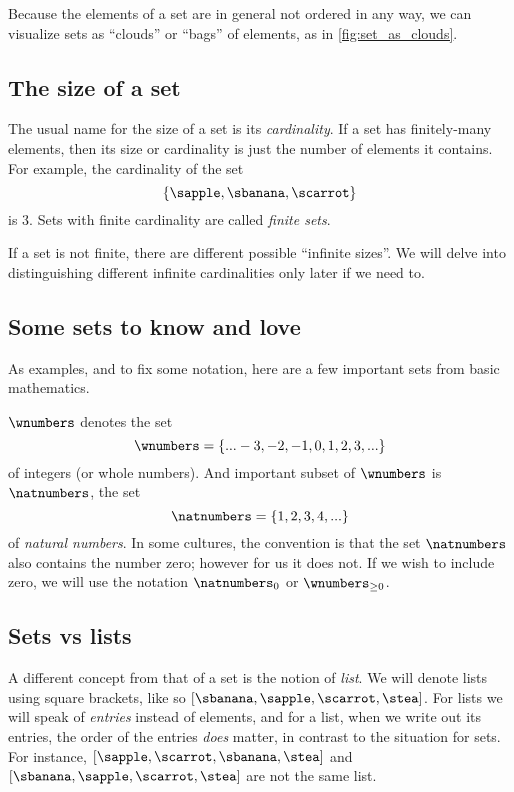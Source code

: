 Because the elements of a set are in general not ordered in any way, we can visualize sets as ``clouds'' or ``bags'' of elements, as in \cref{fig:set_as_clouds}.

\subsection{The size of a set}

The usual name for the size of a set is its \emph{cardinality}. If a set has finitely-many elements, then its size or cardinality is just the number of elements it contains. For example, the cardinality of the set
\begin{equation}
\{ \sapple, \sbanana, \scarrot \}
\end{equation}
is $3$. Sets with finite cardinality are called \emph{finite sets}. 

If a set is not finite, there are different possible ``infinite sizes''. We will delve into distinguishing different infinite cardinalities only later if we need to.

\subsection{Some sets to know and love}

As examples, and to fix some notation, here are a few important sets from basic mathematics. 

$\wnumbers$ denotes the set
\begin{equation}
\wnumbers = \{... -3, -2, -1, 0, 1, 2, 3, ... \}
\end{equation}
of integers (or whole numbers). And important subset of $\wnumbers$ is $\natnumbers$, the set
\begin{equation}
\natnumbers = \{1, 2, 3, 4, ... \}
\end{equation}
of \emph{natural numbers}. In some cultures, the convention is that the set $\natnumbers$ also contains the number zero; however for us it does not. If we wish to include zero, we will use the notation $\natnumbers_0$ or $\wnumbers_{\geq 0}$. 


 


\subsection{Sets vs lists}

A different concept from that of a set is the notion of \emph{list}.
We will denote lists using square brackets, like so $[\sbanana, \sapple, \scarrot, \stea]$. 
For lists we will speak of \emph{entries} instead of elements, and for a list, when we write out its entries, the order of the entries \emph{does} matter, in contrast to the situation for sets.
For instance, $[ \sapple, \scarrot, \sbanana, \stea]$ and $[\sbanana, \sapple, \scarrot, \stea]$ are not the same list.

